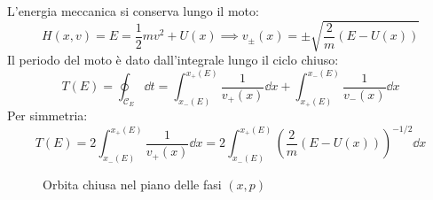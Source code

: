 L'energia meccanica si conserva lungo il moto:
\begin{equation}
    H(x,v) = E = \frac{1}{2}mv^2 + U(x) \implies v_\pm(x) = \pm\sqrt{\frac{2}{m}(E - U(x))}
\end{equation}
Il periodo del moto è dato dall'integrale lungo il ciclo chiuso:
\begin{equation}
    T(E) = \oint_{\mathcal{C}_E} \dd{t} = \int_{x_-(E)}^{x_+(E)} \frac{1}{v_+(x)} \dd{x} + \int_{x_+(E)}^{x_-(E)} \frac{1}{v_-(x)} \dd{x}
\end{equation}
Per simmetria:
\begin{equation}
    T(E) = 2 \int_{x_-(E)}^{x_+(E)} \frac{1}{v_+(x)} \dd{x} = 2 \int_{x_-(E)}^{x_+(E)} \left( \frac{2}{m} (E - U(x)) \right)^{-1/2} \dd{x}
\end{equation}
\begin{figure}[h]
    \centering
    \caption{Orbita chiusa nel piano delle fasi $(x, p)$}
\end{figure}

